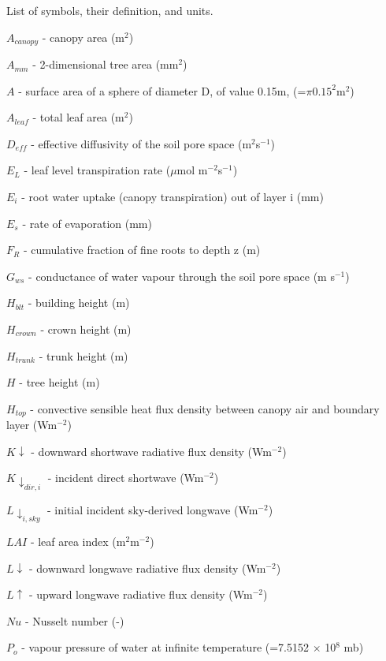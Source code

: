 

List of symbols, their definition, and units.
{\footnotesize
\begin{description} %


\item $A _{canopy}$  -  canopy area (m$^{2}$) 
\item $A _{mm}$  -  2-dimensional tree area (mm$^{2}$) 
\item $A$  -  surface area of a sphere of diameter D, of value 0.15m, (=$\pi 0.15^{2}$m$^{2}$) 
\item $A_{leaf}$  -  total leaf area (m$^{2}$) 
\item $D_{eff}$  -  effective diffusivity of the soil pore space (m$^{2}$s$^{-1}$) 
\item $E_{L}$  -  leaf level transpiration rate ($\mu$mol m$^{-2}$s$^{-1}$) 
\item $E_{i}$  -   root water uptake (canopy transpiration) out of layer i (mm) 
\item $E_{s}$  -  rate of evaporation (mm) 
\item $F_{R}$  -  cumulative fraction of fine roots to depth z (m) 
\item $G_{ws}$  -  conductance of water vapour through the soil pore space (m s$^{-1}$) 
\item $H _{blt}$  -  building height (m) 
\item $H _{crown}$  -  crown height (m) 
\item $H _{trunk}$  -  trunk height (m) 
\item $H$    -   tree height (m)
\item $H_{top}$  -    convective sensible heat flux density between canopy air and boundary layer (Wm$^{-2}$) 
\item $K\downarrow$  -  downward shortwave radiative flux density (Wm$^{-2}$) 
\item $K\downarrow_{dir,i}$   -  incident direct shortwave (Wm$^{-2}$)  
\item $L \downarrow_{i,sky}$   -   initial incident sky-derived longwave (Wm$^{-2}$)  
\item $LAI$  -  leaf area index (m$^{2}$m$^{-2}$) 
\item $L\downarrow$  -   downward longwave radiative flux density (Wm$^{-2}$)
\item $L\uparrow$  -  upward longwave radiative flux density (Wm$^{-2}$) 
\item $Nu$  -  Nusselt number (-) 
\item $P_{o}$  -  vapour pressure of water at infinite temperature (=7.5152 $\times$ 10$^8$ mb) 

\end{description}}
